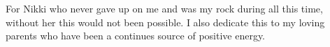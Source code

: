 
\begin{dedication} 

For Nikki who never gave up on me and was my rock during all this time, without her this would not been possible. I also dedicate this to my loving parents who have been a continues source of positive energy.

\end{dedication}

